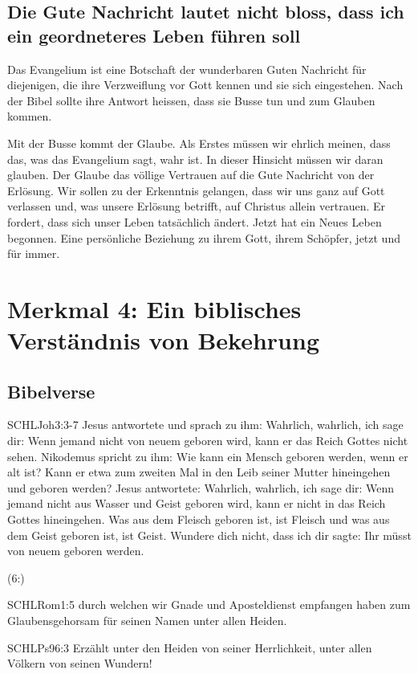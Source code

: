 \documentclass{../../inc/mybib}
\begin{document}
\subsection{Die Gute Nachricht lautet nicht bloss, dass ich ein geordneteres Leben führen soll}
Das Evangelium ist eine Botschaft der wunderbaren Guten Nachricht für diejenigen, die ihre Verzweiflung vor Gott kennen und sie sich eingestehen. Nach der Bibel sollte ihre Antwort heissen, dass sie Busse tun und zum Glauben kommen.

Mit der Busse kommt der Glaube. Als Erstes müssen wir ehrlich meinen, dass das, was das Evangelium sagt, wahr ist. In dieser Hinsicht müssen wir daran glauben. Der Glaube das völlige Vertrauen auf die Gute Nachricht von der Erlösung. Wir sollen zu der Erkenntnis gelangen, dass wir uns ganz auf Gott verlassen und, was unsere Erlösung betrifft, auf Christus allein vertrauen. Er fordert, dass sich unser Leben tatsächlich ändert. Jetzt hat ein Neues Leben begonnen. Eine persönliche Beziehung zu ihrem Gott, ihrem Schöpfer, jetzt und für immer.
\section{Merkmal 4: Ein biblisches Verständnis von Bekehrung}
\subsection{Bibelverse}
\begin{bibelbox}{SCHL}{Joh}{3:3-7}
    Jesus antwortete und sprach zu ihm: Wahrlich, wahrlich, ich sage dir: Wenn jemand nicht von neuem geboren wird, kann er das Reich Gottes nicht sehen. Nikodemus spricht zu ihm: Wie kann ein Mensch geboren werden, wenn er alt ist? Kann er etwa zum zweiten Mal in den Leib seiner Mutter hineingehen und geboren werden? Jesus antwortete: Wahrlich, wahrlich, ich sage dir: Wenn jemand nicht aus Wasser und Geist geboren wird, kann er nicht in das Reich Gottes hineingehen. Was aus dem Fleisch geboren ist, ist Fleisch und was aus dem Geist geboren ist, ist Geist. Wundere dich  nicht, dass ich dir sagte: Ihr müsst von neuem geboren werden.
\end{bibelbox}
(6:)
\begin{bibelbox}{SCHL}{Rom}{1:5}
    durch welchen wir Gnade und Aposteldienst empfangen haben zum Glaubensgehorsam für seinen Namen unter allen Heiden.
\end{bibelbox}
\begin{bibelbox}{SCHL}{Ps}{96:3}
    Erzählt unter den Heiden von seiner Herrlichkeit, unter allen Völkern von seinen Wundern!
\end{bibelbox}
\end{document}
